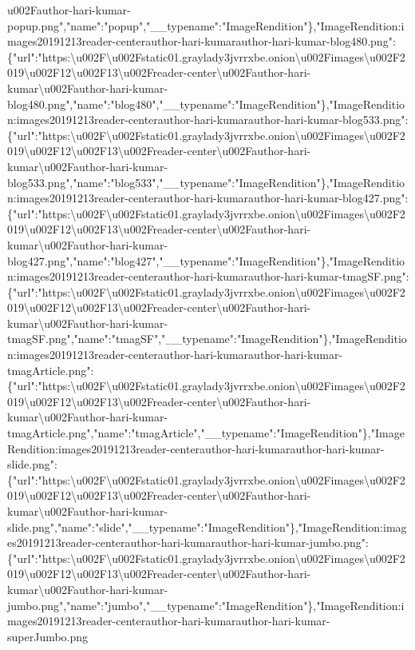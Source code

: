 u002Fauthor-hari-kumar-popup.png","name":"popup","\_\_typename":"ImageRendition"\},"ImageRendition:images20191213reader-centerauthor-hari-kumarauthor-hari-kumar-blog480.png":\{"url":"https:\textbackslash{}u002F\textbackslash{}u002Fstatic01.graylady3jvrrxbe.onion\textbackslash{}u002Fimages\textbackslash{}u002F2019\textbackslash{}u002F12\textbackslash{}u002F13\textbackslash{}u002Freader-center\textbackslash{}u002Fauthor-hari-kumar\textbackslash{}u002Fauthor-hari-kumar-blog480.png","name":"blog480","\_\_typename":"ImageRendition"\},"ImageRendition:images20191213reader-centerauthor-hari-kumarauthor-hari-kumar-blog533.png":\{"url":"https:\textbackslash{}u002F\textbackslash{}u002Fstatic01.graylady3jvrrxbe.onion\textbackslash{}u002Fimages\textbackslash{}u002F2019\textbackslash{}u002F12\textbackslash{}u002F13\textbackslash{}u002Freader-center\textbackslash{}u002Fauthor-hari-kumar\textbackslash{}u002Fauthor-hari-kumar-blog533.png","name":"blog533","\_\_typename":"ImageRendition"\},"ImageRendition:images20191213reader-centerauthor-hari-kumarauthor-hari-kumar-blog427.png":\{"url":"https:\textbackslash{}u002F\textbackslash{}u002Fstatic01.graylady3jvrrxbe.onion\textbackslash{}u002Fimages\textbackslash{}u002F2019\textbackslash{}u002F12\textbackslash{}u002F13\textbackslash{}u002Freader-center\textbackslash{}u002Fauthor-hari-kumar\textbackslash{}u002Fauthor-hari-kumar-blog427.png","name":"blog427","\_\_typename":"ImageRendition"\},"ImageRendition:images20191213reader-centerauthor-hari-kumarauthor-hari-kumar-tmagSF.png":\{"url":"https:\textbackslash{}u002F\textbackslash{}u002Fstatic01.graylady3jvrrxbe.onion\textbackslash{}u002Fimages\textbackslash{}u002F2019\textbackslash{}u002F12\textbackslash{}u002F13\textbackslash{}u002Freader-center\textbackslash{}u002Fauthor-hari-kumar\textbackslash{}u002Fauthor-hari-kumar-tmagSF.png","name":"tmagSF","\_\_typename":"ImageRendition"\},"ImageRendition:images20191213reader-centerauthor-hari-kumarauthor-hari-kumar-tmagArticle.png":\{"url":"https:\textbackslash{}u002F\textbackslash{}u002Fstatic01.graylady3jvrrxbe.onion\textbackslash{}u002Fimages\textbackslash{}u002F2019\textbackslash{}u002F12\textbackslash{}u002F13\textbackslash{}u002Freader-center\textbackslash{}u002Fauthor-hari-kumar\textbackslash{}u002Fauthor-hari-kumar-tmagArticle.png","name":"tmagArticle","\_\_typename":"ImageRendition"\},"ImageRendition:images20191213reader-centerauthor-hari-kumarauthor-hari-kumar-slide.png":\{"url":"https:\textbackslash{}u002F\textbackslash{}u002Fstatic01.graylady3jvrrxbe.onion\textbackslash{}u002Fimages\textbackslash{}u002F2019\textbackslash{}u002F12\textbackslash{}u002F13\textbackslash{}u002Freader-center\textbackslash{}u002Fauthor-hari-kumar\textbackslash{}u002Fauthor-hari-kumar-slide.png","name":"slide","\_\_typename":"ImageRendition"\},"ImageRendition:images20191213reader-centerauthor-hari-kumarauthor-hari-kumar-jumbo.png":\{"url":"https:\textbackslash{}u002F\textbackslash{}u002Fstatic01.graylady3jvrrxbe.onion\textbackslash{}u002Fimages\textbackslash{}u002F2019\textbackslash{}u002F12\textbackslash{}u002F13\textbackslash{}u002Freader-center\textbackslash{}u002Fauthor-hari-kumar\textbackslash{}u002Fauthor-hari-kumar-jumbo.png","name":"jumbo","\_\_typename":"ImageRendition"\},"ImageRendition:images20191213reader-centerauthor-hari-kumarauthor-hari-kumar-superJumbo.png